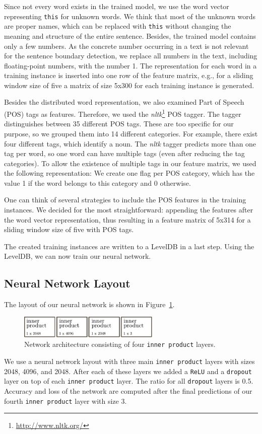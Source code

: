 Since not every word exists in the trained model, we use the word vector representing \texttt{this} for unknown words.
We think that most of the unknown words are proper names, which can be replaced with \texttt{this} without changing the meaning and structure of the entire sentence.
Besides, the trained model contains only a few numbers.
As the concrete number occurring in a text is not relevant for the sentence boundary detection, we replace all numbers in the text, including floating-point numbers, with the number 1.
The representation for each word in a training instance is inserted into one row of the feature matrix, e.g., for a sliding window size of five a matrix of size 5x300 for each training instance is generated.

Besides the distributed word representation, we also examined Part of Speech (POS) tags as features.
Therefore, we used the \emph{nltk}\footnote{\url{http://www.nltk.org/}} POS tagger.
The tagger distinguishes between 35 different POS tags.
These are too specific for our purpose, so we grouped them into 14 different categories.
For example, there exist four different tags, which identify a noun.
The \emph{nltk} tagger predicts more than one tag per word, so one word can have multiple tags (even after reducing the tag categories).
To allow the existence of multiple tags in our feature matrix, we used the following representation:
We create one flag per POS category, which has the value 1 if the word belongs to this category and 0 otherwise.

One can think of several strategies to include the POS features in the training instances.
We decided for the most straightforward: appending the features after the word vector representation, thus resulting in a feature matrix of 5x314 for a sliding window size of five with POS tags.

The created training instances are written to a LevelDB in a last step.
Using the LevelDB, we can now train our neural network.

\subsection{Neural Network Layout}

The layout of our neural network is shown in Figure~\ref{fig:net_lexical}.
\begin{figure}[ht]
    \centering
    \includegraphics[width=0.6\textwidth]{img/net_lexical.pdf}
    \caption{Network architecture consisting of four \texttt{inner product} layers.}
    \label{fig:net_lexical}
\end{figure}
We use a neural network layout with three main \texttt{inner product} layers with sizes 2048, 4096, and 2048.
After each of these layers we added a \texttt{ReLU} and a \texttt{dropout} layer on top of each \texttt{inner product} layer.
The ratio for all \texttt{dropout} layers is 0.5.
Accuracy and loss of the network are computed after the final predictions of our fourth \texttt{inner product} layer with size 3.

